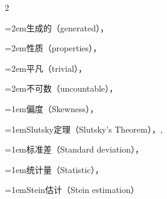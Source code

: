 \begin{multicols}{2}
\par\noindent\hangindent=2em\hspace*{1em}\label{idx:974}生成的（generated），\hyperref[idxocc:974:59]{\pageref*{idxocc:974:59}}\par
\par\noindent\hangindent=2em\hspace*{1em}\label{idx:975}性质（properties），\hyperref[exercise:1.11]{\pageref*{exercise:1.11}}\par
\par\noindent\hangindent=2em\hspace*{1em}\label{idx:976}平凡（trivial），\hyperref[idxocc:976:36]{\pageref*{idxocc:976:36}}\par
\par\noindent\hangindent=2em\hspace*{1em}\label{idx:977}不可数（uncountable），\hyperref[ex:1.2.3]{\pageref*{ex:1.2.3}}\par
\par\addvspace{2pt}
\par\noindent\hangindent=1em\hspace*{0em}\label{idx:978}偏度（Skewness），\hyperref[exercise:2.28]{\pageref*{exercise:2.28}}\par
\par\addvspace{2pt}
\par\noindent\hangindent=1em\hspace*{0em}\label{idx:979}Slutsky定理（Slutsky’s Theorem），\hyperref[thm:5.5.17]{\pageref*{thm:5.5.17}}, \hyperref[idxocc:979:429]{\pageref*{idxocc:979:429}}\par
\par\addvspace{2pt}
\par\noindent\hangindent=1em\hspace*{0em}\label{idx:980}标准差（Standard deviation），\hyperref[def:2.3.2]{\pageref*{def:2.3.2}}\par
\par\addvspace{2pt}
\par\noindent\hangindent=1em\hspace*{0em}\label{idx:981}统计量（Statistic），\hyperref[def:5.2.1]{\pageref*{def:5.2.1}}\par
\par\addvspace{2pt}
\par\noindent\hangindent=1em\hspace*{0em}\label{idx:982}Stein估计（Stein estimation）\par

\end{multicols}
